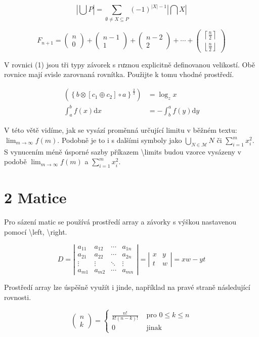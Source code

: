 \documentclass[a4paper, 11pt, twocolumn]{article}[25.2.2024]
\begin{document}
$$
|\bigcup P|=\sum_{\emptyset \neq X \subseteq P}(-1)^{|X|-1}|\bigcap X|
$$

$$
F_{n+1}=\left(\begin{array}{c}
n \\
0
\end{array}\right)+\left(\begin{array}{c}
n-1 \\
1
\end{array}\right)+\left(\begin{array}{c}
n-2 \\
2
\end{array}\right)+\cdots+\left(\begin{array}{c}
\left\lceil\frac{n}{2}\right\rceil \\
\left\lfloor\frac{n}{2}\right\rfloor
\end{array}\right)
$$

V rovnici (1) jsou tři typy závorek s rưznou explicitně definovanou velikostí. Obě rovnice mají svisle zarovnaná rovnítka. Použijte k tomu vhodné prostředí.


\begin{align*}
\left(\left\{b \otimes\left[c_{1} \oplus c_{2}\right] \circ a\right\}^{\frac{2}{3}}\right) & =\log _{z} x  \tag{1}\\
\int_{a}^{b} f(x) \mathrm{d} x & =-\int_{b}^{a} f(y) \mathrm{d} y \tag{2}
\end{align*}


V této větě vidíme, jak se vysází proměnná určující limitu v běžném textu: $\lim _{m \rightarrow \infty} f(m)$. Podobně je to i s dalšími symboly jako $\bigcup_{N \in \mathcal{M}} N$ či $\sum_{i=1}^{m} x_{i}^{2}$. S vynucením méně úsporné sazby příkazem \textbackslash limits budou vzorce vysázeny v podobě $\lim _{m \rightarrow \infty} f(m)$ a $\sum_{i=1}^{m} x_{i}^{2}$.

\section*{2 Matice}
Pro sázení matic se používá prostředí array a závorky s výškou nastavenou pomocí \textbackslash left, \textbackslash right.

$$
D=\left|\begin{array}{cccc}
a_{11} & a_{12} & \cdots & a_{1 n} \\
a_{21} & a_{22} & \cdots & a_{2 n} \\
\vdots & \vdots & \ddots & \vdots \\
a_{m 1} & a_{m 2} & \cdots & a_{m n}
\end{array}\right|=\left|\begin{array}{cc}
x & y \\
t & w
\end{array}\right|=x w-y t
$$

Prostředí array lze úspěšně využít i jinde, například na pravé straně následující rovnosti.

$$
\left(\begin{array}{l}
n \\
k
\end{array}\right)= \begin{cases}\frac{n !}{k !(n-k) !} & \text { pro } 0 \leq k \leq n \\
0 & \text { jinak }\end{cases}
$$
\end{document}

